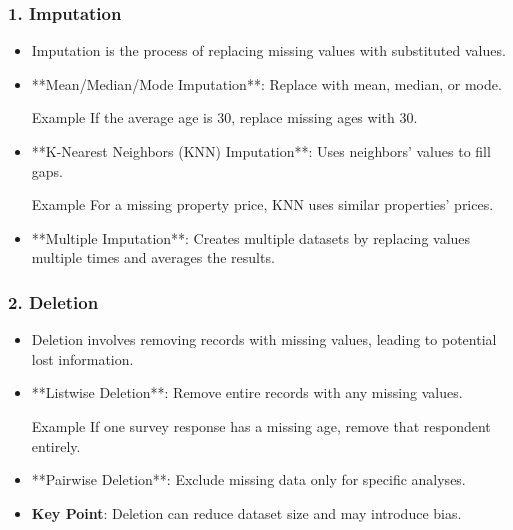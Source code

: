 \documentclass[aspectratio=169]{beamer}
\begin{document}
\begin{frame}[fragile]
    \frametitle{1. Imputation}
    \begin{itemize}
        \item Imputation is the process of replacing missing values with substituted values.
        \item **Mean/Median/Mode Imputation**: Replace with mean, median, or mode.
        \begin{block}{Example}
            If the average age is 30, replace missing ages with 30.
        \end{block}
        
        \item **K-Nearest Neighbors (KNN) Imputation**: Uses neighbors' values to fill gaps.
        \begin{block}{Example}
            For a missing property price, KNN uses similar properties' prices.
        \end{block}
        
        \item **Multiple Imputation**: Creates multiple datasets by replacing values multiple times and averages the results.
    \end{itemize}
\end{frame}

\begin{frame}[fragile]
    \frametitle{2. Deletion}
    \begin{itemize}
        \item Deletion involves removing records with missing values, leading to potential lost information.
        \item **Listwise Deletion**: Remove entire records with any missing values.
        \begin{block}{Example}
            If one survey response has a missing age, remove that respondent entirely.
        \end{block}

        \item **Pairwise Deletion**: Exclude missing data only for specific analyses.
        \item \textbf{Key Point}: Deletion can reduce dataset size and may introduce bias.
    \end{itemize}
\end{frame}
\end{document}
